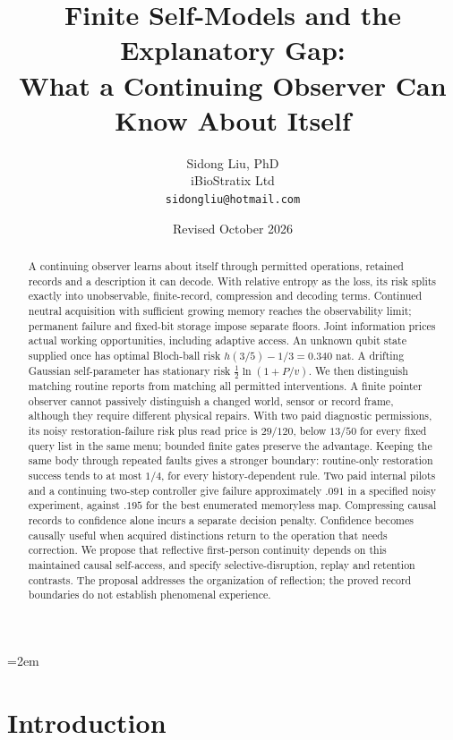 \documentclass[12pt]{article}
\title{%
  \textbf{Finite Self-Models and the Explanatory Gap:}\\
  \textbf{What a Continuing Observer Can Know About Itself}%
}
\author{
  Sidong Liu, PhD \\
  \small iBioStratix Ltd \\
  \small \texttt{sidongliu@hotmail.com}
}
\date{Revised October 2026}
\theoremstyle{definition}
\theoremstyle{remark}
\begin{document}
\emergencystretch=2em
\raggedbottom
{}

\maketitle

\begin{abstract}
A continuing observer learns about itself through permitted operations,
retained records and a description it can decode. With relative entropy
as the loss, its risk splits exactly into unobservable, finite-record,
compression and decoding terms. Continued neutral acquisition with
sufficient growing memory reaches the observability limit; permanent
failure and fixed-bit storage impose separate floors. Joint information
prices actual working opportunities, including adaptive access.
An unknown qubit state supplied once has optimal Bloch-ball risk
$h(3/5)-1/3=0.340$ nat. A drifting Gaussian self-parameter has stationary
risk $\tfrac12\ln(1+P/v)$.
We then distinguish matching routine reports from matching all permitted
interventions. A finite pointer observer cannot passively distinguish
a changed world, sensor or record frame, although they require different
physical repairs. With two paid diagnostic permissions, its noisy
restoration-failure risk plus read price is $29/120$, below $13/50$ for every fixed query list
in the same menu; bounded finite gates preserve the advantage.
Keeping the same body through repeated faults gives a stronger boundary:
routine-only restoration success tends to at most $1/4$, for every
history-dependent rule. Two paid internal pilots and a continuing
two-step controller give failure approximately $.091$ in a specified
noisy experiment, against $.195$ for the best enumerated memoryless map.
Compressing causal records to confidence alone incurs a separate decision penalty. Confidence becomes causally useful when acquired distinctions return
to the operation that needs correction. We propose that reflective
first-person continuity depends on this maintained causal self-access,
and specify selective-disruption, replay and retention contrasts.
The proposal addresses the organization of reflection; the proved
record boundaries do not establish phenomenal experience.
\end{abstract}

\clearpage
\tableofcontents
\clearpage

\section{Introduction}\label{sec:1}
\end{document}
